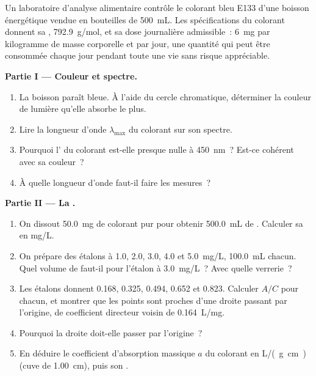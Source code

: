 \begin{problem}
\label{pb:g11:absorbance:1}
Un laboratoire d'analyse alimentaire contrôle le colorant bleu E133
d'une boisson énergétique vendue en bouteilles de \qty{500}{mL}. Les
spécifications du colorant donnent sa , \qty{792.9}{g/mol},
et sa dose journalière admissible~: \qty{6}{mg} par kilogramme de masse
corporelle et par jour, une quantité qui peut être consommée chaque jour
pendant toute une vie sans risque appréciable.

\medskip
\noindent\textbf{Partie I --- Couleur et spectre.}
\begin{enumerate}
  \item La boisson paraît bleue. À l'aide du cercle chromatique,
        déterminer la couleur de lumière qu'elle absorbe le plus.
  \item Lire la longueur d'onde $\lambda_{\max}$ du colorant sur son
        spectre.
  \item Pourquoi l' du colorant est-elle presque nulle à
        \qty{450}{nm}~? Est-ce cohérent avec sa couleur~?
  \item À quelle longueur d'onde faut-il faire les mesures~?
\end{enumerate}

\medskip
\noindent\textbf{Partie II --- La .}
\begin{enumerate}[resume]
  \item On dissout \qty{50.0}{mg} de colorant pur pour obtenir
        \qty{500.0}{mL} de . Calculer sa  en \si{mg/L}.
  \item On prépare des étalons à 1.0, 2.0, 3.0, 4.0 et \qty{5.0}{mg/L},
        \qty{100.0}{mL} chacun. Quel volume de  faut-il pour
        l'étalon à \qty{3.0}{mg/L}~? Avec quelle verrerie~?
  \item Les étalons donnent 0.168, 0.325, 0.494, 0.652 et 0.823. Calculer
        $A / C$ pour chacun, et montrer que les points sont proches d'une
        droite passant par l'origine, de coefficient directeur voisin de
        \qty{0.164}{L/mg}.
  \item Pourquoi la droite doit-elle passer par l'origine~?
  \item En déduire le coefficient d'absorption massique $a$ du colorant
        en \si{L/(g.cm)} (cuve de \qty{1.00}{cm}), puis son .
\end{enumerate}


\end{problem}
